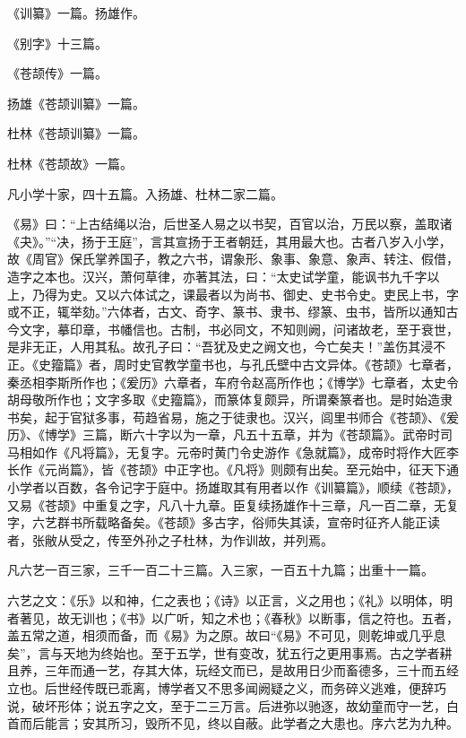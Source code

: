 \documentclass[12pt,UTF8]{ctexbook}
\begin{document}
《训纂》一篇。扬雄作。



《别字》十三篇。



《苍颉传》一篇。



扬雄《苍颉训纂》一篇。



杜林《苍颉训纂》一篇。



杜林《苍颉故》一篇。



凡小学十家，四十五篇。入扬雄、杜林二家二篇。



《易》曰：“上古结绳以治，后世圣人易之以书契，百官以治，万民以察，盖取诸《夬》。”“决，扬于王庭”，言其宣扬于王者朝廷，其用最大也。古者八岁入小学，故《周官》保氏掌养国子，教之六书，谓象形、象事、象意、象声、转注、假借，造字之本也。汉兴，萧何草律，亦著其法，曰：“太史试学童，能讽书九千字以上，乃得为史。又以六体试之，课最者以为尚书、御史、史书令史。吏民上书，字或不正，辄举劾。”六体者，古文、奇字、篆书、隶书、缪篆、虫书，皆所以通知古今文字，摹印章，书幡信也。古制，书必同文，不知则阙，问诸故老，至于衰世，是非无正，人用其私。故孔子曰：“吾犹及史之阙文也，今亡矣夫！”盖伤其浸不正。《史籀篇》者，周时史官教学童书也，与孔氏壁中古文异体。《苍颉》七章者，秦丞相李斯所作也；《爰历》六章者，车府令赵高所作也；《博学》七章者，太史令胡母敬所作也；文字多取《史籀篇》，而篆体复颇异，所谓秦篆者也。是时始造隶书矣，起于官狱多事，苟趋省易，施之于徒隶也。汉兴，闾里书师合《苍颉》、《爰历》、《博学》三篇，断六十字以为一章，凡五十五章，并为《苍颉篇》。武帝时司马相如作《凡将篇》，无复字。元帝时黄门令史游作《急就篇》，成帝时将作大匠李长作《元尚篇》，皆《苍颉》中正字也。《凡将》则颇有出矣。至元始中，征天下通小学者以百数，各令记字于庭中。扬雄取其有用者以作《训纂篇》，顺续《苍颉》，又易《苍颉》中重复之字，凡八十九章。臣复续扬雄作十三章，凡一百二章，无复字，六艺群书所载略备矣。《苍颉》多古字，俗师失其读，宣帝时征齐人能正读者，张敝从受之，传至外孙之子杜林，为作训故，并列焉。



凡六艺一百三家，三千一百二十三篇。入三家，一百五十九篇；出重十一篇。



六艺之文：《乐》以和神，仁之表也；《诗》以正言，义之用也；《礼》以明体，明者著见，故无训也；《书》以广听，知之术也；《春秋》以断事，信之符也。五者，盖五常之道，相须而备，而《易》为之原。故曰“《易》不可见，则乾坤或几乎息矣”，言与天地为终始也。至于五学，世有变改，犹五行之更用事焉。古之学者耕且养，三年而通一艺，存其大体，玩经文而已，是故用日少而畜德多，三十而五经立也。后世经传既已乖离，博学者又不思多闻阙疑之义，而务碎义逃难，便辞巧说，破坏形体；说五字之文，至于二三万言。后进弥以驰逐，故幼童而守一艺，白首而后能言；安其所习，毁所不见，终以自蔽。此学者之大患也。序六艺为九种。
\end{document}
